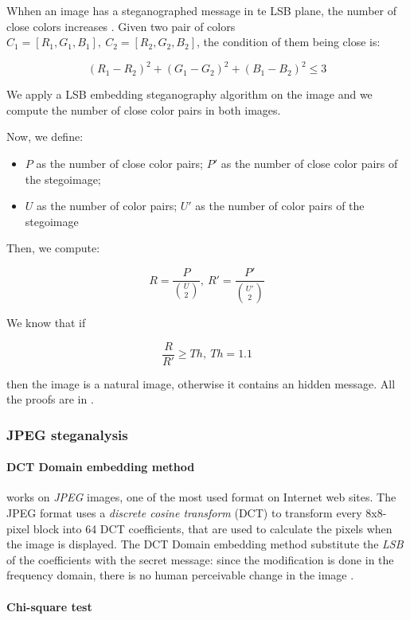 \documentclass[../../main.tex]{subfiles}
\begin{document}
    Whhen an image has a steganographed message in te LSB plane, the number of
    close colors increases \cite{detecting-lsb-steganography}. Given two pair of
    colors $C_1=[R_1,G_1,B_1],\ C_2=[R_2,G_2,B_2]$, the condition of them being
    close is:

    \[ (R_1-R_2)^2+(G_1-G_2)^2+(B_1-B_2)^2 \leq 3 \]

    We apply a LSB embedding steganography algorithm on the image and we compute
    the number of close color pairs in both images.

    Now, we define:

    \begin{itemize}
        \item $P$ as the number of close color pairs; $P'$ as the number of
              close color pairs of the stegoimage;
        \item $U$ as the number of color pairs; $U'$ as the number of color
              pairs of the stegoimage
    \end{itemize}

    Then, we compute:

    \[ R = \frac{P}{\binom{U}{2}},\ R' = \frac{P'}{\binom{U'}{2}} \]

    We know that if

    \[ \frac{R}{R'} \geq Th,\ Th = 1.1 \]

    \noindent then the image is a natural image, otherwise it contains an hidden
    message. All the proofs are in \cite{detecting-lsb-steganography}.

    \subsubsection{JPEG steganalysis}
    \paragraph{DCT Domain embedding method} works on \emph{JPEG} images, one of
    the most used format on Internet web sites.
    The JPEG format uses a \emph{discrete cosine transform} (DCT) to transform
    every 8x8-pixel block into 64 DCT coefficients, that are used to calculate
    the pixels when the image is displayed.
    The DCT Domain embedding method substitute the \emph{LSB} of the
    coefficients with the secret message: since the modification is done in the
    frequency domain, there is no human perceivable change in the image
    \cite{jpeg-image-internet}.
    \paragraph{Chi-square test}
\end{document}
